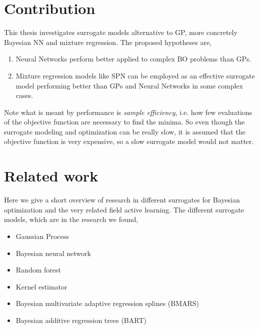 \section{Contribution}
This thesis investigates surrogate models alternative to GP, more concretely Bayesian NN
and mixture regression. The proposed hypotheses are,
\begin{enumerate}
    \item Neural Networks perform better applied to complex BO problems than GPs.
    \item Mixture regression models like SPN can be employed as an effective surrogate model
    performing better than GPs and Neural Networks in some complex cases. 
\end{enumerate}

Note what is meant by performance is \textit{sample efficiency}, i.e. how few evaluations of the objective function
are necessary to find the minima. So even though the surrogate modeling and optimization can be really slow, 
it is assumed that the objective function is very expensive, so a slow surrogate model would not matter.

    

\section{Related work}
Here we give a short overview of research in different surrogates for Bayesian optimization
and the very related field active learning. The different surrogate models, which are in the 
research we found, 
\begin{itemize}
    \item Gaussian Process
    \item Bayesian neural network
    \item Random forest
    \item Kernel estimator
    \item Bayesian multivariate adaptive regression splines (BMARS)
    \item Bayesian additive regression trees (BART)
\end{itemize}

